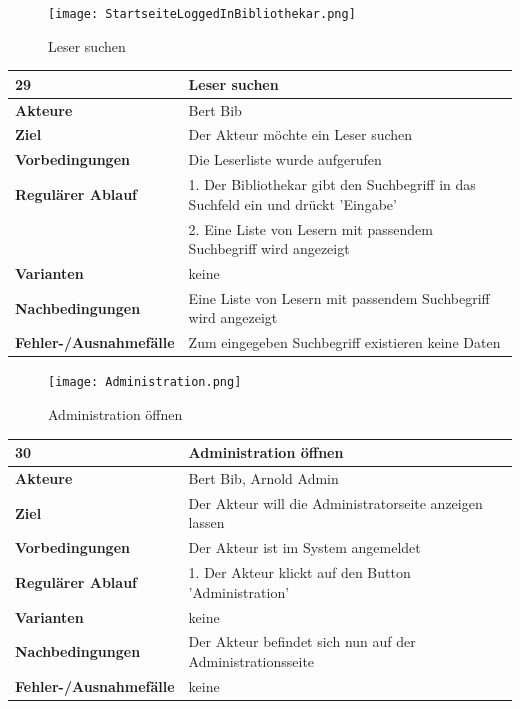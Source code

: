 \documentclass[fontsize=12pt,paper=a4,twoside]{scrartcl}
\begin{document}
\begin{figure}
	[H] \caption{Leser suchen} 
	\texttt{[image: StartseiteLoggedInBibliothekar.png]} \label{pic:LeserSuchen} 
\end{figure}
\begin{table}
	[H] \label{29} 
	\begin{tabular}
		{|l|p{10cm}|} \hline \textbf{29} & \textbf{Leser suchen} \\
		\hline \textbf{Akteure} & Bert Bib\\
		\hline \textbf{Ziel} & Der Akteur möchte ein Leser suchen \\
		\hline \textbf{Vorbedingungen} & Die Leserliste wurde aufgerufen \\
		\hline \textbf{Regulärer Ablauf} & 1. Der Bibliothekar gibt den Suchbegriff in das Suchfeld ein und drückt 'Eingabe' \\
		&2. Eine Liste von Lesern mit passendem Suchbegriff wird angezeigt\\
		\hline \textbf{Varianten} & keine \\
		\hline \textbf{Nachbedingungen} & Eine Liste von Lesern mit passendem Suchbegriff wird angezeigt\\
		\hline \textbf{Fehler-/Ausnahmefälle} & Zum eingegeben Suchbegriff existieren keine Daten\\
		\hline 
	\end{tabular}
\end{table}
\begin{figure}
	[H] \caption{Administration öffnen} 
	\texttt{[image: Administration.png]} \label{pic:Admin} 
\end{figure}
\begin{table}
	[H] \label{30} 
	\begin{tabular}
		{|l|p{10cm}|} \hline \textbf{30} & \textbf{Administration öffnen} \\
		\hline \textbf{Akteure} & Bert Bib, Arnold Admin\\
		\hline \textbf{Ziel} & Der Akteur will die Administratorseite anzeigen lassen \\
		\hline \textbf{Vorbedingungen} & Der Akteur ist im System angemeldet \\
		\hline \textbf{Regulärer Ablauf} & 1. Der Akteur klickt auf den Button 'Administration' \\
		\hline \textbf{Varianten} & keine \\
		\hline \textbf{Nachbedingungen} & Der Akteur befindet sich nun auf der Administrationsseite\\
		\hline \textbf{Fehler-/Ausnahmefälle} & keine\\
		\hline 
	\end{tabular}
\end{table}
\end{document}

